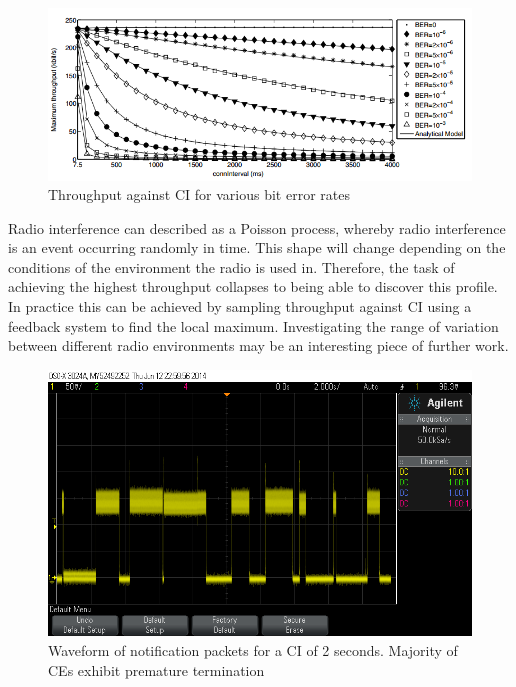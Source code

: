 \documentclass[]{article}
\begin{document}
\begin{figure}[H]
	\begin{center}
		\includegraphics[width = \textwidth]{ber}
	\end{center}
	\caption{Throughput against \ac{CI} for various bit error rates \cite{Gomez2011}}
	\label{fig:ber}
\end{figure}

Radio interference can described as a Poisson process, whereby radio interference is an event occurring randomly in time. This shape will change depending on the conditions of the environment the radio is used in. Therefore, the task of achieving the highest throughput collapses to being able to discover this profile. In practice this can be achieved by sampling throughput against \ac{CI} using a feedback system to find the local maximum. Investigating the range of variation between different radio environments may be an interesting piece of further work. 

\begin{figure}[H]
	\begin{center}
		\includegraphics[width = \textwidth]{2sec}
	\end{center}
	\caption{Waveform of notification packets for a \ac{CI} of 2 seconds. Majority of \ac{CE}s exhibit premature termination}
	\label{fig:2sec}
\end{figure}
\end{document}
